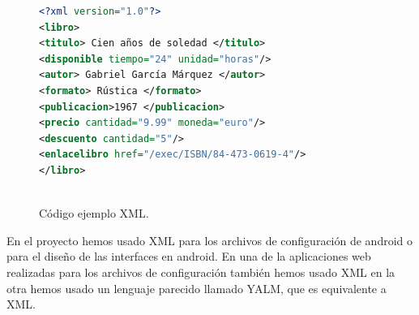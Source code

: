 \begin{figure}
\begin{small}
 \begin{center}

    
  \begin{lstlisting}[language=XML]   
<?xml version="1.0"?>
<libro>
<titulo> Cien años de soledad </titulo>
<disponible tiempo="24" unidad="horas"/>
<autor> Gabriel García Márquez </autor>
<formato> Rústica </formato>
<publicacion>1967 </publicacion>
<precio cantidad="9.99" moneda="euro"/>
<descuento cantidad="5"/>
<enlacelibro href="/exec/ISBN/84-473-0619-4"/>
</libro>
    
  \end{lstlisting}

\end{center}
\end{small}
  
  \caption{Código ejemplo XML.}
  \label{cod:XML}
\end{figure}

En el proyecto hemos usado XML para los archivos de configuración de android o para el diseño de las interfaces en android. En una de la aplicaciones web realizadas para los archivos de configuración también hemos usado XML en la otra hemos usado un lenguaje parecido llamado YALM, que es equivalente a XML.
























